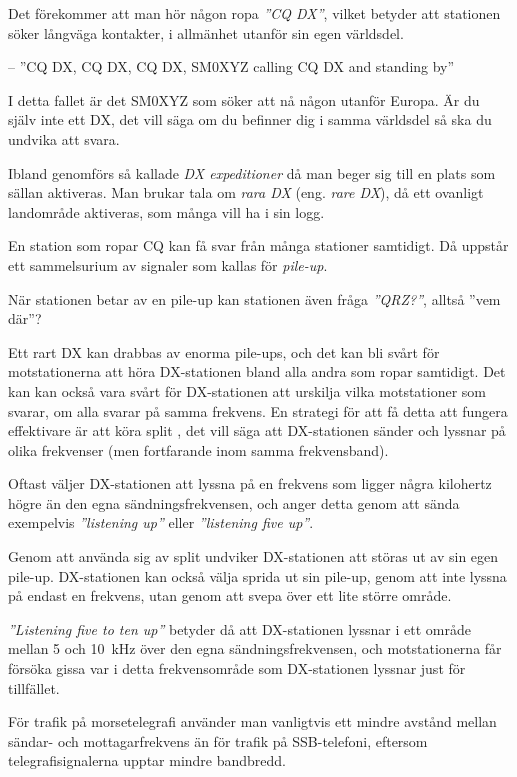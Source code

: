 Det förekommer att man hör någon ropa \emph{''CQ DX''}, vilket betyder att
stationen söker långväga kontakter, i allmänhet utanför sin egen världsdel.

-- ''CQ DX, CQ DX, CQ DX, SM0XYZ calling CQ DX and standing by''

I detta fallet är det SM0XYZ som söker att nå någon utanför Europa.
Är du själv inte ett DX, det vill säga om du befinner dig i samma världsdel så
ska du undvika att svara.

Ibland genomförs så kallade \emph{DX expeditioner} då man beger sig till en
plats som sällan aktiveras.
Man brukar tala om \emph{rara DX} (eng. \emph{rare DX}), då ett ovanligt
landområde aktiveras, som många vill ha i sin logg.

En station som ropar CQ kan få svar från många stationer samtidigt.
Då uppstår ett sammelsurium av signaler som kallas för \emph{pile-up}.

När stationen betar av en pile-up kan stationen även fråga \emph{''QRZ?''},
alltså ''vem där''?

Ett rart DX kan drabbas av enorma pile-ups, och det kan bli svårt för
motstationerna att höra DX-stationen bland alla andra som ropar samtidigt.
Det kan kan också vara svårt för DX-stationen att urskilja vilka motstationer
som svarar, om alla svarar på samma frekvens.
En strategi för att få detta att fungera effektivare är att köra split
\cite{LowBandDX}, det vill säga att DX-stationen sänder och lyssnar på olika
frekvenser (men fortfarande inom samma frekvensband).

Oftast väljer DX-stationen att lyssna på en frekvens som ligger några kilohertz
högre än den egna sändningsfrekvensen, och anger detta genom att sända
exempelvis \emph{''listening up''} eller \emph{''listening five up''}.

Genom att använda sig av split undviker DX-stationen att störas ut av sin egen
pile-up.
DX-stationen kan också välja sprida ut sin pile-up, genom att inte lyssna på
endast en frekvens, utan genom att svepa över ett lite större område.

\emph{''Listening five to ten up''} betyder då att DX-stationen lyssnar i ett
område mellan 5 och \qty{10}{\kilo\hertz} över den egna sändningsfrekvensen, och
motstationerna får försöka gissa var i detta frekvensområde som DX-stationen
lyssnar just för tillfället.

För trafik på morsetelegrafi använder man vanligtvis ett mindre avstånd mellan
sändar- och mottagarfrekvens än för trafik på SSB-telefoni, eftersom
telegrafisignalerna upptar mindre bandbredd.

